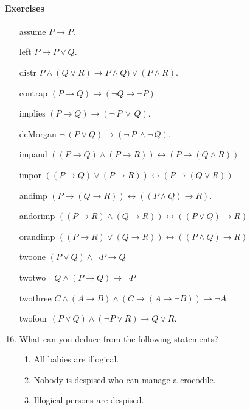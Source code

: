  \paragraph{\bf Exercises}
 \begin{enumerate}
 \item[assume] $P \rightarrow P$.
 \item[left]$ P \rightarrow P\lor Q$.
  \item[distr] $P\land (Q\lor R) \rightarrow P\land Q)\lor (P\land R).$
  \item [contrap]$ (P\rightarrow Q) \rightarrow (\neg Q \rightarrow \neg P)$
  \item[implies] $(P\rightarrow Q)\rightarrow (\neg\,P\,\lor \,Q).$
\item[deMorgan] $\neg\,(P\lor Q)\rightarrow (\neg\,P\,\land \neg\,Q).$

  
 \item[impand] $((P \rightarrow Q) \land (P \rightarrow R)) \leftrightarrow (P \rightarrow (Q\land R))$
\item[impor] $((P \rightarrow Q) \lor (P \rightarrow R)) \leftrightarrow (P \rightarrow (Q\lor R))$
\item[andimp] $(P\rightarrow(Q\rightarrow R)) \leftrightarrow ((P\land Q) \rightarrow R)$.
\item[andorimp] $((P \rightarrow R) \land (Q \rightarrow R)) \leftrightarrow ((P \lor Q) \rightarrow R)$
\item[orandimp] $((P \rightarrow R) \lor (Q \rightarrow R)) \leftrightarrow ((P \land Q) \rightarrow R)$
\item[twoone] $(P \lor Q) \land \neg  P \rightarrow Q$
\item[twotwo] $\neg Q \land (P \rightarrow Q) \rightarrow  \neg P$
\item[twothree] $ C \land (A \rightarrow B) \land (C \rightarrow ( A \rightarrow \neg B)) \rightarrow \neg A$
\item[twofour] $ (P \lor  Q) \land (\neg P \lor R) \rightarrow Q \lor R$.

\item  What can you deduce from the following statements?
\begin{enumerate}
\item All babies are illogical.
\item Nobody is despised who can manage a crocodile.
\item Illogical persons are despised.
\end{enumerate}




\end{enumerate}
